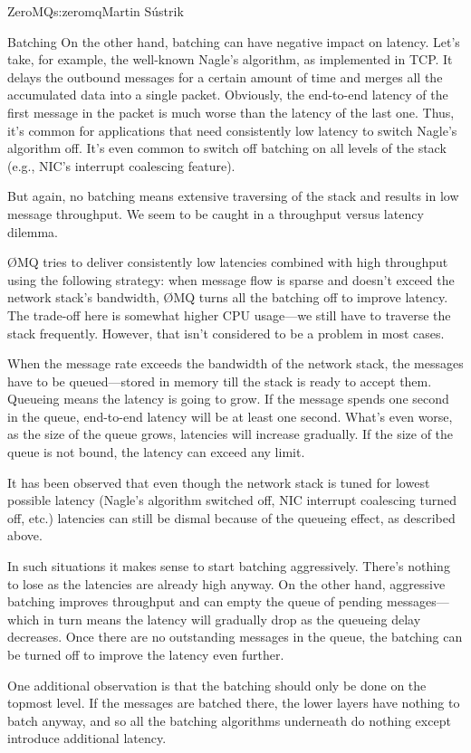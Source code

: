 \begin{aosachapter}{ZeroMQ}{s:zeromq}{Martin S\'{u}strik}
\begin{aosasect1}{Batching}
On the other hand, batching can have negative impact on latency. Let's
take, for example, the well-known Nagle's
algorithm,
as implemented in TCP. It delays the outbound messages for a certain
amount of time and merges all the accumulated data into a single
packet. Obviously, the end-to-end latency of the first message in the
packet is much worse than the latency of the last one. Thus, it's
common for applications that need consistently low latency to switch
Nagle's algorithm off. It's even common to switch off batching on
all levels of the stack (e.g., NIC's interrupt coalescing feature).

But again, no batching means extensive traversing of the stack and
results in low message throughput. We seem to be caught in a throughput
versus latency dilemma.

{\O}MQ tries to deliver consistently low latencies combined with high
throughput using the following strategy: when message flow is sparse and
doesn't exceed the network stack's bandwidth, {\O}MQ turns all the batching
off to improve latency. The trade-off here is somewhat higher CPU
usage---we still have to traverse the stack frequently. However, that
isn't considered to be a problem in most cases.

When the message rate exceeds the bandwidth of the network stack, the
messages have to be queued---stored in memory till the stack is ready
to accept them. Queueing means the latency is going to grow. If the
message spends one second in the queue, end-to-end latency will be at
least one second. What's even worse, as the size of the queue grows,
latencies will increase gradually. If the size of the queue is not
bound, the latency can exceed any limit.

It has been observed that even though the network stack is tuned for
lowest possible latency (Nagle's algorithm switched off, NIC interrupt
coalescing turned off, etc.) latencies can still be dismal because of
the queueing effect, as described above.

In such situations it makes sense to start batching
aggressively. There's nothing to lose as the latencies are already
high anyway. On the other hand, aggressive batching improves
throughput and can empty the queue of pending messages---which in
turn means the latency will gradually drop as the queueing delay
decreases. Once there are no outstanding messages in the queue, the
batching can be turned off to improve the latency even further.

One additional observation is that the batching should only be done on
the topmost level. If the messages are batched there, the lower layers
have nothing to batch anyway, and so all the batching algorithms
underneath do nothing except introduce additional latency.


\end{aosasect1}
\end{aosachapter}
